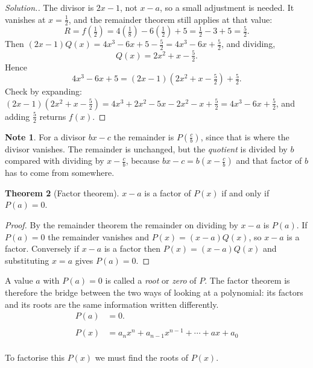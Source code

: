 \documentclass[11pt,a4paper]{article}
\theoremstyle{definition}
\newtheorem{thm}{Theorem}[section]
\newtheorem{note}[thm]{Note}
\newenvironment{solution}
  {\renewcommand{\qedsymbol}{}\begin{proof}[\textit{Solution}.]}
  {\end{proof}}
\begin{document}
\begin{solution}
The divisor is $2x-1$, not $x-a$, so a small adjustment is needed. It vanishes at
$x=\frac{1}{2}$, and the remainder theorem still applies at that value:
$$R=f\left(\tfrac{1}{2}\right)=4\left(\tfrac{1}{8}\right)-6\left(\tfrac{1}{2}\right)+5
=\tfrac{1}{2}-3+5=\tfrac{5}{2} .$$
Then $(2x-1)Q(x)=4x^{3}-6x+5-\frac{5}{2}=4x^{3}-6x+\frac{5}{2}$, and dividing,
$$Q(x)=2x^{2}+x-\tfrac{5}{2} .$$
Hence
$$4x^{3}-6x+5=(2x-1)\left(2x^{2}+x-\tfrac{5}{2}\right)+\tfrac{5}{2} .$$
Check by expanding: $(2x-1)\left(2x^{2}+x-\frac{5}{2}\right)
=4x^{3}+2x^{2}-5x-2x^{2}-x+\frac{5}{2}=4x^{3}-6x+\frac{5}{2}$, and adding
$\frac{5}{2}$ returns $f(x)$.
\end{solution}

\begin{note}
For a divisor $bx-c$ the remainder is $P\left(\frac{c}{b}\right)$, since that is
where the divisor vanishes. The remainder is unchanged, but the \emph{quotient} is
divided by $b$ compared with dividing by $x-\frac{c}{b}$, because
$bx-c=b\left(x-\frac{c}{b}\right)$ and that factor of $b$ has to come from
somewhere.
\end{note}

\begin{thm}[Factor theorem]
$x-a$ is a factor of $P(x)$ if and only if $P(a)=0$.
\end{thm}

\begin{proof}
By the remainder theorem the remainder on dividing by $x-a$ is $P(a)$. If
$P(a)=0$ the remainder vanishes and $P(x)=(x-a)Q(x)$, so $x-a$ is a factor.
Conversely if $x-a$ is a factor then $P(x)=(x-a)Q(x)$ and substituting $x=a$ gives
$P(a)=0$.
\end{proof}

A value $a$ with $P(a)=0$ is called a \emph{root} or \emph{zero} of $P$. The factor
theorem is therefore the bridge between the two ways of looking at a polynomial:
its factors and its roots are the same information written differently.\\
\begin{align*}
P(a) & =0.\\\\
P(x) & = a_nx^n+a_{n-1}x^{n-1}+\cdots +ax+a_0\\
\end{align*}

To factorise this $P(x)$ we must find the roots of $P(x)$.\\
\end{document}
